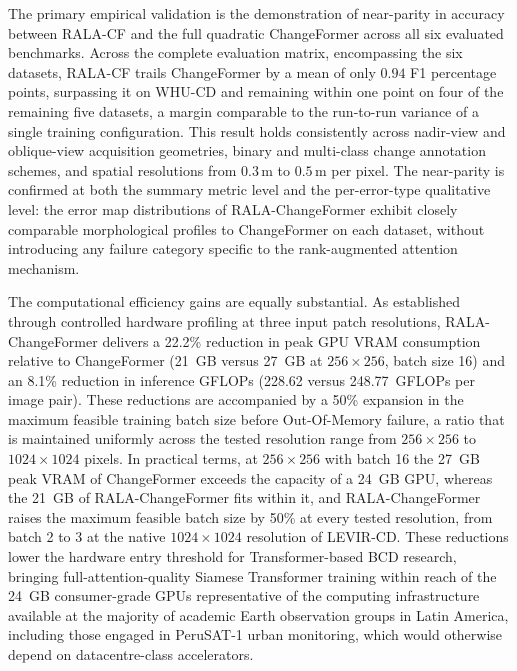 The primary empirical validation is the demonstration of near-parity in accuracy between \ac{RALA-CF} and the full quadratic ChangeFormer \cite{Bandara2022ChangeFormer} across all six evaluated benchmarks. Across the complete evaluation matrix, encompassing the six datasets, \ac{RALA-CF} trails ChangeFormer by a mean of only $0.94$ F1 percentage points, surpassing it on WHU-CD and remaining within one point on four of the remaining five datasets, a margin comparable to the run-to-run variance of a single training configuration. This result holds consistently across nadir-view and oblique-view acquisition geometries, binary and multi-class change annotation schemes, and spatial resolutions from $0.3\,\mathrm{m}$ to $0.5\,\mathrm{m}$ per pixel. The near-parity is confirmed at both the summary metric level and the per-error-type qualitative level: the error map distributions of RALA-ChangeFormer exhibit closely comparable morphological profiles to ChangeFormer on each dataset, without introducing any failure category specific to the rank-augmented attention mechanism.

The computational efficiency gains are equally substantial. As established through controlled hardware profiling at three input patch resolutions, RALA-ChangeFormer delivers a 22.2\% reduction in peak \ac{GPU} \ac{VRAM} consumption relative to ChangeFormer (21~GB versus 27~GB at $256 \times 256$, batch size 16) and an 8.1\% reduction in inference \ac{GFLOPs} (228.62 versus 248.77~\ac{GFLOPs} per image pair). These reductions are accompanied by a 50\% expansion in the maximum feasible training batch size before Out-Of-Memory failure, a ratio that is maintained uniformly across the tested resolution range from $256 \times 256$ to $1024 \times 1024$ pixels. In practical terms, at $256 \times 256$ with batch 16 the 27~GB peak \ac{VRAM} of ChangeFormer exceeds the capacity of a 24~GB \ac{GPU}, whereas the 21~GB of RALA-ChangeFormer fits within it, and RALA-ChangeFormer raises the maximum feasible batch size by 50\% at every tested resolution, from batch 2 to 3 at the native $1024 \times 1024$ resolution of LEVIR-CD. These reductions lower the hardware entry threshold for Transformer-based \ac{BCD} research, bringing full-attention-quality Siamese Transformer training within reach of the 24~GB consumer-grade GPUs representative of the computing infrastructure available at the majority of academic Earth observation groups in Latin America, including those engaged in PeruSAT-1 urban monitoring, which would otherwise depend on datacentre-class accelerators.

